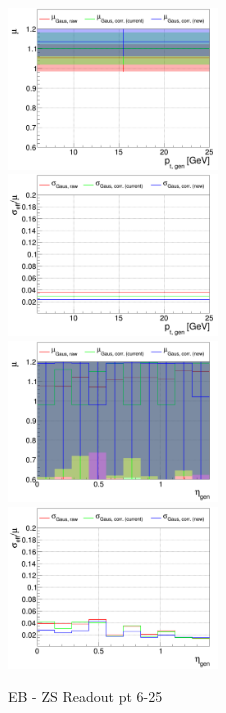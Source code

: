 \begin{figure}
\includegraphics[width=0.495\textwidth]{./plots_pdf/ECAL_plots/plotsNOPU/EB/ZS/pdf/GENPT/EBZS_GENPT_0006_0025_MuOverBins.pdf}
\includegraphics[width=0.495\textwidth]{./plots_pdf/ECAL_plots/plotsNOPU/EB/ZS/pdf/GENPT/EBZS_GENPT_0006_0025_EffSigmaOverBins.pdf}
\includegraphics[width=0.495\textwidth]{./plots_pdf/ECAL_plots/plotsNOPU/EB/ZS/pdf/GENETA/EBZS_GENETA_0006_0025_MuOverBins.pdf}
\includegraphics[width=0.495\textwidth]{./plots_pdf/ECAL_plots/plotsNOPU/EB/ZS/pdf/GENETA/EBZS_GENETA_0006_0025_EffSigmaOverBins.pdf}
\caption{EB - ZS Readout pt 6-25}
\end{figure}





